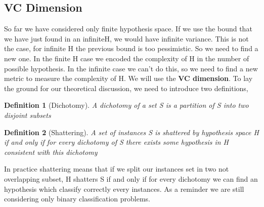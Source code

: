 \documentclass[main.tex]{subfiles}
\newtheorem{definition}{Definition}[section]
\begin{document}
\subsection{VC Dimension}
So far we have considered only finite hypothesis space. If we use the bound that we have just found in an infinite\footnotemark H, we would have infinite variance. This is not the case, for infinite H the previous bound is too pessimistic. So we need to find a new one. In the finite H case we encoded the complexity of H in the number of possible hypothesis. In the infinite case we can't do this, so we need to find a new metric to measure the complexity of H. We will use the \textbf{VC dimension}. To lay the ground for our theoretical discussion, we need to introduce two definitions,
\begin{definition}[Dichotomy]
    A dichotomy of a set S is a partition of S into two disjoint subsets
\end{definition}
\begin{definition}[Shattering]
    A set of instances S is shattered by hypothesis space H if and only if for
    every dichotomy of S there exists some hypothesis in H consistent with this
    dichotomy
\end{definition}
In practice shattering means that if we split our instances set in two not overlapping subset, H shatters S if and only if for every dichotomy we can find an hypothesis which classify correctly every instances. As a reminder we are still considering only binary classification problems.
\end{document}
